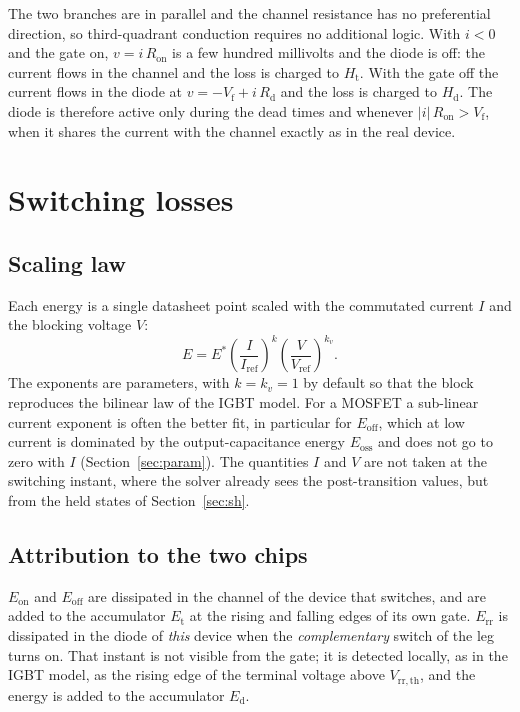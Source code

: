 \documentclass[11pt,a4paper]{article}
\newcommand{\Eon}{E_{\mathrm{on}}}
\newcommand{\Eoff}{E_{\mathrm{off}}}
\newcommand{\Err}{E_{\mathrm{rr}}}
\newcommand{\Ht}{H_{\mathrm{t}}}
\newcommand{\Hd}{H_{\mathrm{d}}}
\begin{document}
The two branches are in parallel and the channel resistance has no
preferential direction, so third-quadrant conduction requires no additional
logic. With $i<0$ and the gate on, $v = i\,R_\mathrm{on}$ is a few hundred
millivolts and the diode is off: the current flows in the channel and the loss
is charged to $\Ht$. With the gate off the current flows in the diode at
$v = -V_\mathrm{f} + i\,R_\mathrm{d}$ and the loss is charged to $\Hd$. The
diode is therefore active only during the dead times and whenever
$|i|\,R_\mathrm{on} > V_\mathrm{f}$, when it shares the current with the channel
exactly as in the real device.

\section{Switching losses}

\subsection{Scaling law}

Each energy is a single datasheet point scaled with the commutated current
$I$ and the blocking voltage $V$:
\begin{equation}
E = E^\ast \left(\frac{I}{I_\mathrm{ref}}\right)^{k} \left(\frac{V}{V_\mathrm{ref}}\right)^{k_v}.
\label{eq:scaling}
\end{equation}
The exponents are parameters, with $k = k_v = 1$ by default so that the block
reproduces the bilinear law of the IGBT model. For a MOSFET a sub-linear
current exponent is often the better fit, in particular for $\Eoff$, which at
low current is dominated by the output-capacitance energy
$E_\mathrm{oss}$ and does not go to zero with $I$ (Section~\ref{sec:param}).
The quantities $I$ and $V$ are not taken at the switching instant, where the
solver already sees the post-transition values, but from the held states of
Section~\ref{sec:sh}.

\subsection{Attribution to the two chips}

$\Eon$ and $\Eoff$ are dissipated in the channel of the device that switches,
and are added to the accumulator $E_\mathrm{t}$ at the rising and falling edges
of its own gate. $\Err$ is dissipated in the diode of \emph{this} device when
the \emph{complementary} switch of the leg turns on. That instant is not
visible from the gate; it is detected locally, as in the IGBT model, as the
rising edge of the terminal voltage above $V_\mathrm{rr,th}$, and the energy is
added to the accumulator $E_\mathrm{d}$.
\end{document}
